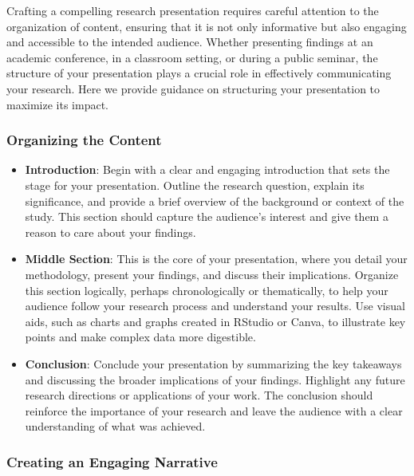 \documentclass[
]{book}
\begin{document}
Crafting a compelling research presentation requires careful attention to the organization of content, ensuring that it is not only informative but also engaging and accessible to the intended audience. Whether presenting findings at an academic conference, in a classroom setting, or during a public seminar, the structure of your presentation plays a crucial role in effectively communicating your research. Here we provide guidance on structuring your presentation to maximize its impact.

\hypertarget{organizing-the-content}{%
\subsubsection{Organizing the Content}\label{organizing-the-content}}

\begin{itemize}
\item
  \textbf{Introduction}: Begin with a clear and engaging introduction that sets the stage for your presentation. Outline the research question, explain its significance, and provide a brief overview of the background or context of the study. This section should capture the audience's interest and give them a reason to care about your findings.
\item
  \textbf{Middle Section}: This is the core of your presentation, where you detail your methodology, present your findings, and discuss their implications. Organize this section logically, perhaps chronologically or thematically, to help your audience follow your research process and understand your results. Use visual aids, such as charts and graphs created in RStudio or Canva, to illustrate key points and make complex data more digestible.
\item
  \textbf{Conclusion}: Conclude your presentation by summarizing the key takeaways and discussing the broader implications of your findings. Highlight any future research directions or applications of your work. The conclusion should reinforce the importance of your research and leave the audience with a clear understanding of what was achieved.
\end{itemize}

\hypertarget{creating-an-engaging-narrative}{%
\subsubsection{Creating an Engaging Narrative}\label{creating-an-engaging-narrative}}
\end{document}
